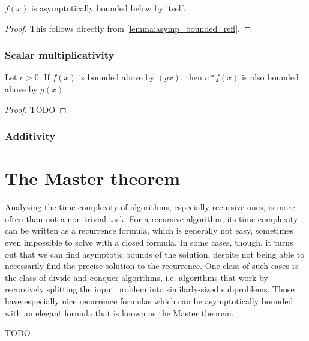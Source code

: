 \begin{lemma}
    \label{lemma:asymp_bounded_below_refl}
    \leanok
    $f(x)$ is asymptotically bounded below by itself.

\end{lemma}

\begin{proof}
    \leanok
    This follows directly from \ref{lemma:asymp_bounded_refl}.
\end{proof}


\subsubsection{Scalar multiplicativity}


\begin{lemma}
    \label{lemma:asymp_bounded_above_pos_smul}
    \leanok
    Let $c > 0$. If $f(x)$ is bounded above by $(gx)$, then $c*f(x)$ is also bounded
    above by $g(x)$.
\end{lemma}

\begin{proof}
    \leanok
    TODO
\end{proof}


\subsubsection{Additivity}


\section{The Master theorem}

Analyzing the time complexity of algorithms, especially recursive ones, is more often 
than not a non-trivial task. For a recursive algorithm, its time complexity can be 
written as a recurrence formula, which is generally not easy, sometimes even impossible 
to solve with a closed formula. In some cases, though, it turns out that we can find 
asymptotic bounds of the solution, despite not being able to necessarily find the 
precise solution to the recurrence. One class of such cases is the class of 
divide-and-conquer algorithms, i.e. algorithms that work by recursively splitting the input 
problem into similarly-sized subproblems. Those have especially nice recurrence formulas 
which can be asymptotically bounded with an elegant formula that is known as the Master theorem.

\begin{theorem}
TODO
\end{theorem}
